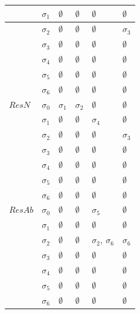 \documentclass[11pt,a4paper]{article}
\begin{document}
\begin{table}[]
\begin{tabular}{|l|l|l|l|l|l|}
     & $\sigma_1$ &  $\emptyset$  & $\emptyset$ & $\emptyset$   &  $\emptyset$  \\ \hline
     & $\sigma_2$ &  $\emptyset$  & $\emptyset$ & $\emptyset$   &  $\sigma_3$  \\ \hline
     & $\sigma_3$ &  $\emptyset$  & $\emptyset$ & $\emptyset$   &  $\emptyset$  \\ \hline
     & $\sigma_4$ &  $\emptyset$  & $\emptyset$ & $\emptyset$   &  $\emptyset$  \\ \hline
     & $\sigma_5$ &  $\emptyset$  & $\emptyset$ & $\emptyset$   &  $\emptyset$  \\ \hline
     & $\sigma_6$ &  $\emptyset$  & $\emptyset$ & $\emptyset$   &  $\emptyset$  \\ \hline
$ResN$ & $\sigma_0$ &  $\sigma_1$ & $\sigma_2$ & $\emptyset$ & $\emptyset$   \\ \hline
     & $\sigma_1$ &  $\emptyset$  & $\emptyset$ & $\sigma_4$   &  $\emptyset$  \\ \hline
     & $\sigma_2$ &  $\emptyset$  & $\emptyset$ & $\emptyset$   &  $\sigma_3$  \\ \hline
     & $\sigma_3$ &  $\emptyset$  & $\emptyset$ & $\emptyset$   &  $\emptyset$  \\ \hline
     & $\sigma_4$ &  $\emptyset$  & $\emptyset$ & $\emptyset$   &  $\emptyset$  \\ \hline
     & $\sigma_5$ &  $\emptyset$  & $\emptyset$ & $\emptyset$   &  $\emptyset$  \\ \hline
     & $\sigma_6$ &  $\emptyset$  & $\emptyset$ & $\emptyset$   &  $\emptyset$  \\ \hline
 $ResAb$ & $\sigma_0$ &  $\emptyset$ & $\emptyset$ & $\sigma_5$ & $\emptyset$   \\ \hline
     & $\sigma_1$ &  $\emptyset$  & $\emptyset$ & $\emptyset$   &  $\emptyset$  \\ \hline
     & $\sigma_2$ &  $\emptyset$  & $\emptyset$ & $\sigma_2,~\sigma_6$   &  $\sigma_6$  \\ \hline
     & $\sigma_3$ &  $\emptyset$  & $\emptyset$ & $\emptyset$   &  $\emptyset$  \\ \hline
     & $\sigma_4$ &  $\emptyset$  & $\emptyset$ & $\emptyset$   &  $\emptyset$  \\ \hline
     & $\sigma_5$ &  $\emptyset$  & $\emptyset$ & $\emptyset$   &  $\emptyset$  \\ \hline
     & $\sigma_6$ &  $\emptyset$  & $\emptyset$ & $\emptyset$   &  $\emptyset$  \\ \hline          
\end{tabular}
\end{table}
\end{document}
